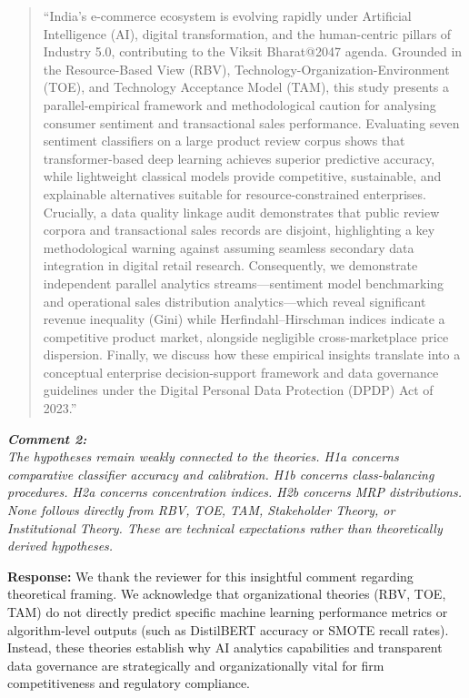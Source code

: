 \documentclass[11pt]{article}
\newcommand{\comment}[1]{\vspace{12pt}\noindent\colorbox{gray!10}{\parbox{\dimexpr\textwidth-2\fboxsep\relax}{\color{commentcolor}\itshape #1}}\vspace{6pt}}
\newcommand{\response}{\vspace{6pt}\noindent\textbf{Response: }}
\newcommand{\update}[1]{\textcolor{updatecolor}{#1}}
\begin{document}
\begin{quote}
\update{``India's e-commerce ecosystem is evolving rapidly under Artificial Intelligence (AI), digital transformation, and the human-centric pillars of Industry 5.0, contributing to the Viksit Bharat@2047 agenda. Grounded in the Resource-Based View (RBV), Technology-Organization-Environment (TOE), and Technology Acceptance Model (TAM), this study presents a parallel-empirical framework and methodological caution for analysing consumer sentiment and transactional sales performance. Evaluating seven sentiment classifiers on a large product review corpus shows that transformer-based deep learning achieves superior predictive accuracy, while lightweight classical models provide competitive, sustainable, and explainable alternatives suitable for resource-constrained enterprises. Crucially, a data quality linkage audit demonstrates that public review corpora and transactional sales records are disjoint, highlighting a key methodological warning against assuming seamless secondary data integration in digital retail research. Consequently, we demonstrate independent parallel analytics streams—sentiment model benchmarking and operational sales distribution analytics—which reveal significant revenue inequality (Gini) while Herfindahl–Hirschman indices indicate a competitive product market, alongside negligible cross-marketplace price dispersion. Finally, we discuss how these empirical insights translate into a conceptual enterprise decision-support framework and data governance guidelines under the Digital Personal Data Protection (DPDP) Act of 2023.''}
\end{quote}

\comment{\textbf{Comment 2:} \\
The hypotheses remain weakly connected to the theories. H1a concerns comparative classifier accuracy and calibration. H1b concerns class-balancing procedures. H2a concerns concentration indices. H2b concerns MRP distributions. None follows directly from RBV, TOE, TAM, Stakeholder Theory, or Institutional Theory. These are technical expectations rather than theoretically derived hypotheses.}

\response
We thank the reviewer for this insightful comment regarding theoretical framing. We acknowledge that organizational theories (RBV, TOE, TAM) do not directly predict specific machine learning performance metrics or algorithm-level outputs (such as DistilBERT accuracy or SMOTE recall rates). Instead, these theories establish why AI analytics capabilities and transparent data governance are strategically and organizationally vital for firm competitiveness and regulatory compliance.
\end{document}
